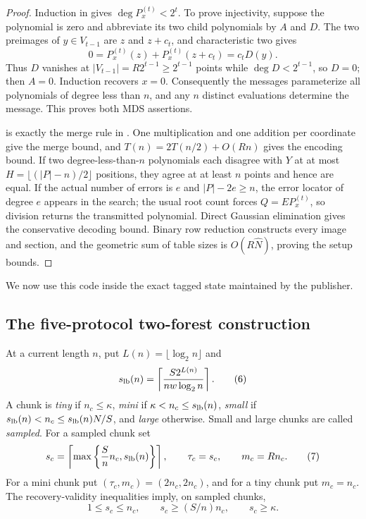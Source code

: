 \documentclass[11pt]{article}
\begin{document}
\begin{proof}
Induction in  gives $\deg P_x^{(t)}<2^t$.  To
prove injectivity, suppose the polynomial is zero and abbreviate its two child
polynomials by $A$ and $D$.  The two preimages of $y\in V_{t-1}$ are $z$ and
$z+c_t$, and characteristic two gives
\[
 0=P_x^{(t)}(z)+P_x^{(t)}(z+c_t)=c_tD(y).
\]
Thus $D$ vanishes at $|V_{t-1}|=R2^{t-1}\ge2^{t-1}$ points while
$\deg D<2^{t-1}$, so $D=0$; then $A=0$.  Induction recovers $x=0$.
Consequently the messages parameterize all polynomials of degree less than
$n$, and any $n$ distinct evaluations determine the message.  This proves both
MDS assertions.

 is exactly the merge rule in
.  One
multiplication and one addition per coordinate give the merge bound, and
$T(n)=2T(n/2)+O(Rn)$ gives the encoding bound.  If two degree-less-than-$n$
polynomials each disagree with $Y$ at at most
$H=\lfloor(|P|-n)/2\rfloor$ positions, they agree at at least $n$ points and
hence are equal.  If the actual number of errors is $e$ and $|P|-2e\ge n$, the
error locator of degree $e$ appears in the search; the usual root count forces
$Q=EP_x^{(t)}$, so division returns the transmitted polynomial.  Direct
Gaussian elimination gives the conservative decoding bound.  Binary row
reduction constructs every image and section, and the geometric sum of table
sizes is $O(R\widehat N)$, proving the setup bounds.
\end{proof}

We now use this code inside the exact tagged state maintained by the
publisher.

\subsection{The five-protocol two-forest construction}

At a current length $n$, put $L(n)=\lfloor\log_2n\rfloor$ and
\[
 s_{\rm lb}(n)=\left\lceil
  \frac{S2^{L(n)}}{n w\log_2n}\right\rceil.
\tag{6}\label{eq:lower-sampling}
\]
A chunk is \emph{tiny} if $n_c\le\kappa$, \emph{mini} if
$\kappa<n_c\le s_{\rm lb}(n)$, \emph{small} if
$s_{\rm lb}(n)<n_c\le s_{\rm lb}(n)N/S$, and \emph{large} otherwise.
Small and large chunks are called \emph{sampled}.  For a sampled chunk set
\[
 s_c=\left\lceil\max\left\{\frac Sn n_c,s_{\rm lb}(n)\right\}\right\rceil,
 \qquad \tau_c=s_c,\qquad m_c=Rn_c.
\tag{7}\label{eq:sample-size}
\]
For a mini chunk put $(\tau_c,m_c)=(2n_c,2n_c)$, and for a tiny chunk put
$m_c=n_c$.  The recovery-validity inequalities imply, on sampled chunks,
\[
 1\le s_c\le n_c,\qquad s_c\ge(S/n)n_c,\qquad s_c\ge\kappa.
\tag{8}\label{eq:sampling-properties}
\]
\end{document}
